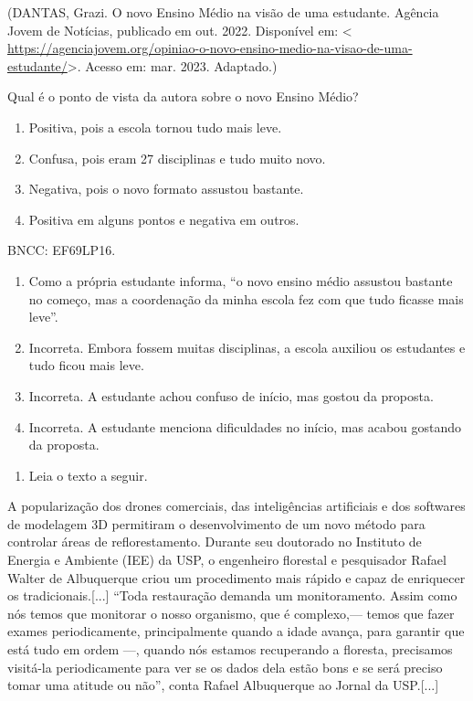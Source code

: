 {(DANTAS, Grazi. O novo Ensino Médio na visão de uma estudante. Agência
Jovem de Notícias, publicado em out. 2022. Disponível em: \textless{}
\url{https://agenciajovem.org/opiniao-o-novo-ensino-medio-na-visao-de-uma-estudante/}\textgreater.
Acesso em: mar. 2023. Adaptado.)

Qual é o ponto de vista da autora sobre o novo Ensino Médio?

\begin{enumerate}
\def\labelenumi{\alph{enumi})}
\item
  Positiva, pois a escola tornou tudo mais leve.
\item
  Confusa, pois eram 27 disciplinas e tudo muito novo.
\item
  Negativa, pois o novo formato assustou bastante.
\item
  Positiva em alguns pontos e negativa em outros.
\end{enumerate}

BNCC: EF69LP16.

\begin{enumerate}
\def\labelenumi{\alph{enumi})}
\item
  Como a própria estudante informa, ``o novo ensino médio assustou
  bastante no começo, mas a coordenação da minha escola fez com que tudo
  ficasse mais leve''.
\item
  Incorreta. Embora fossem muitas disciplinas, a escola auxiliou os
  estudantes e tudo ficou mais leve.
\item
  Incorreta. A estudante achou confuso de início, mas gostou da
  proposta.
\item
  Incorreta. A estudante menciona dificuldades no início, mas acabou
  gostando da proposta.
\end{enumerate}

\begin{enumerate}
\def\labelenumi{\arabic{enumi}.}
\setcounter{enumi}{10}
\tightlist
\item
  Leia o texto a seguir.
\end{enumerate}

A popularização dos drones comerciais, das inteligências artificiais e
dos softwares de modelagem 3D permitiram o desenvolvimento de um novo
método para controlar áreas de reflorestamento. Durante seu doutorado no
Instituto de Energia e Ambiente (IEE) da USP, o engenheiro florestal e
pesquisador Rafael Walter de Albuquerque criou um procedimento mais
rápido e capaz de enriquecer os tradicionais.{[}...{]} ``Toda
restauração demanda um monitoramento. Assim como nós temos que monitorar
o nosso organismo, que é complexo,--- temos que fazer exames
periodicamente, principalmente quando a idade avança, para garantir que
está tudo em ordem ---, quando nós estamos recuperando a floresta,
precisamos visitá-la periodicamente para ver se os dados dela estão bons
e se será preciso tomar uma atitude ou não'', conta Rafael Albuquerque
ao Jornal da USP.{[}...{]}

}
